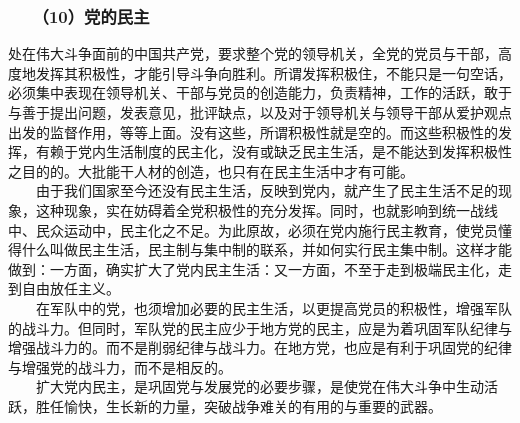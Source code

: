 \documentclass[cn,11pt,chinese]{elegantbook}
\def\myformat#1{\hfil\hfil #1}
\begin{document}
\subsubsection*{\myformat{　　（10）党的民主}}
处在伟大斗争面前的中国共产党，要求整个党的领导机关，全党的党员与干部，高度地发挥其积极性，才能引导斗争向胜利。所谓发挥积极住，不能只是一句空话，必须集中表现在领导机关、干部与党员的创造能力，负责精神，工作的活跃，敢于与善于提出问题，发表意见，批评缺点，以及对于领导机关与领导干部从爱护观点出发的监督作用，等等上面。没有这些，所谓积极性就是空的。而这些积极性的发挥，有赖于党内生活制度的民主化，没有或缺乏民主生活，是不能达到发挥积极性之目的的。大批能干人材的创造，也只有在民主生活中才有可能。\\
　　由于我们国家至今还没有民主生活，反映到党内，就产生了民主生活不足的现象，这种现象，实在妨碍着全党积极性的充分发挥。同时，也就影响到统一战线中、民众运动中，民主化之不足。为此原故，必须在党内施行民主教育，使党员懂得什么叫做民主生活，民主制与集中制的联系，并如何实行民主集中制。这样才能做到：一方面，确实扩大了党内民主生活：又一方面，不至于走到极端民主化，走到自由放任主义。\\
　　在军队中的党，也须增加必要的民主生活，以更提高党员的积极性，增强军队的战斗力。但同时，军队党的民主应少于地方党的民主，应是为着巩固军队纪律与增强战斗力的。而不是削弱纪律与战斗力。在地方党，也应是有利于巩固党的纪律与增强党的战斗力，而不是相反的。\\
　　扩大党内民主，是巩固党与发展党的必要步骤，是使党在伟大斗争中生动活跃，胜任愉快，生长新的力量，突破战争难关的有用的与重要的武器。\\
\end{document}
